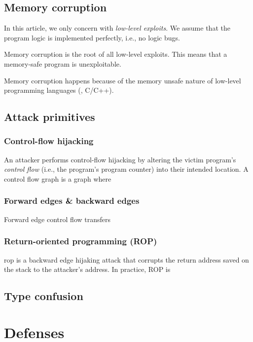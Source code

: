 \documentclass[11pt]{memoir}
\begin{document}
\section{Memory corruption}
In this article, we only concern with \emph{low-level exploits}. 
We assume that the program logic is implemented perfectly, i.e., no logic bugs.


Memory corruption is the root of all low-level exploits.
This means that a memory-safe program is unexploitable.

Memory corruption happens because of the memory unsafe nature of low-level programming languages (\ie, C/C++).



\section{Attack primitives}
\subsection{Control-flow hijacking}
An attacker performs control-flow hijacking by altering the victim program's \emph{control flow} (i.e., the program's program counter) into their intended location. 
A control flow graph is a graph where

\subsection{Forward edges \& backward edges}

Forward edge control flow transfers

\subsection{Return-oriented programming (ROP)}
\gls{rop} is a backward edge hijaking attack that corrupts the return address saved on the stack to the attacker's address.
In practice, ROP is

\section{Type confusion}

\chapter{Defenses}
\end{document}
